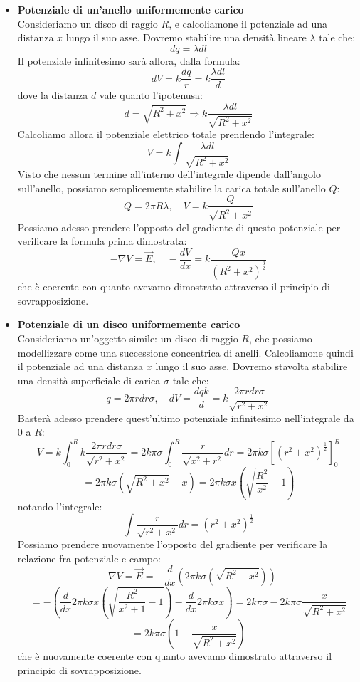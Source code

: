 \documentclass[a4paper,12pt]{article}
\begin{document}
\begin{itemize}
  \item \textbf{Potenziale di un'anello uniformemente carico} \\
    Consideriamo un disco di raggio $R$, e calcoliamone il potenziale ad una distanza $x$ lungo il suo asse. Dovremo stabilire una densità lineare $\lambda$ tale che:
    $$ dq = \lambda dl $$
    Il potenziale infinitesimo sarà allora, dalla formula:
    $$ dV = k \frac{dq}{r} = k\frac{\lambda dl}{d} $$
    dove la distanza $d$ vale quanto l'ipotenusa:
    $$ d = \sqrt{R^2 + x^2} \Rightarrow k\frac{\lambda dl}{\sqrt{R^2 + x^2}} $$
    Calcoliamo allora il potenziale elettrico totale prendendo l'integrale:
    $$ V = k\int \frac{\lambda dl}{\sqrt{R^2 + x^2}}$$
    Visto che nessun termine all'interno dell'integrale dipende dall'angolo sull'anello, possiamo semplicemente stabilire la carica totale sull'anello $Q$:
    $$ Q = 2\pi R \lambda, \quad V = k\frac{Q}{\sqrt{R^2+x^2}}$$
    Possiamo adesso prendere l'opposto del gradiente di questo potenziale per verificare la formula prima dimostrata:
    $$ -\nabla V = \vec{E}, \quad -\frac{dV}{dx} = k \frac{Qx}{(R^2+x^2)^\frac{3}{2}}$$
    che è coerente con quanto avevamo dimostrato attraverso il principio di sovrapposizione.
  \item \textbf{Potenziale di un disco uniformemente carico} \\
    Consideriamo un'oggetto simile: un disco di raggio $R$, che possiamo modellizzare come una successione concentrica di anelli. Calcoliamone quindi il potenziale ad una distanza $x$ lungo il suo asse. Dovremo stavolta
    stabilire una densità superficiale di carica $\sigma$ tale che:
    $$  q = 2\pi r dr \sigma, \quad dV = \frac{dqk}{d} = k\frac{2\pi r dr \sigma}{\sqrt{r^2 + x^2}} $$
    Basterà adesso prendere quest'ultimo potenziale infinitesimo nell'integrale da 0 a $R$:
    $$ V = k\int_0^R k\frac{2\pi r dr \sigma}{\sqrt{r^2 + x^2}} = 2k\pi \sigma \int_0^R \frac{r}{\sqrt{x^2+r^2}}dr = 2\pi k \sigma \left[(r^2+x^2)^{\frac{1}{2}}\right]_0^R $$
    $$ =2\pi k\sigma(\sqrt{R^2+x^2} - x) = 2\pi k \sigma x\left(\sqrt{\frac{R^2}{x^2}} - 1\right) $$
    notando l'integrale:
    $$\int \frac{r}{\sqrt{r^2+x^2}}dr = (r^2+x^2)^\frac{1}{2} $$
    Possiamo prendere nuovamente l'opposto del gradiente per verificare la relazione fra potenziale e campo:
    $$ -\nabla V = \vec{E} = -\frac{d}{dx}\left( 2\pi k\sigma \left( \sqrt{R^2-x^2} \right) \right) $$
    $$ = -\left(\frac{d}{dx} 2\pi k \sigma x \left( \sqrt{\frac{R^2}{x^2+1}-1} \right) - \frac{d}{dx} 2\pi k \sigma x\right) = 2k\pi\sigma - 2k\pi\sigma \frac{x}{\sqrt{R^2+x^2}}$$
    $$ = 2k\pi\sigma\left(1 - \frac{x}{\sqrt{R^2+x^2}}\right) $$
    che è nuovamente coerente con quanto avevamo dimostrato attraverso il principio di sovrapposizione.
\end{itemize}
\end{document}

